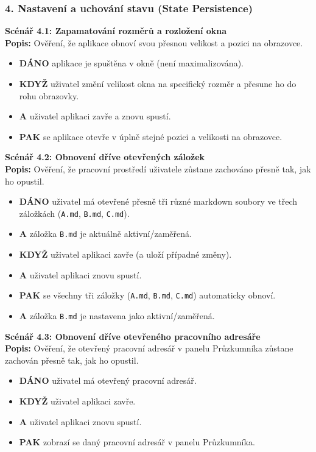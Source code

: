 \documentclass[12pt, a4paper]{article}
\begin{document}
\subsubsection*{4. Nastavení a uchování stavu (State Persistence)}

\textbf{Scénář 4.1: Zapamatování rozměrů a rozložení okna} \\
\textbf{Popis:} Ověření, že aplikace obnoví svou přesnou velikost a pozici na obrazovce.
\begin{itemize}
    \item \textbf{DÁNO} aplikace je spuštěna v okně (není maximalizována).
    \item \textbf{KDYŽ} uživatel změní velikost okna na specifický rozměr a přesune ho do rohu obrazovky.
    \item \textbf{A} uživatel aplikaci zavře a znovu spustí.
    \item \textbf{PAK} se aplikace otevře v úplně stejné pozici a velikosti na obrazovce.
\end{itemize}

\textbf{Scénář 4.2: Obnovení dříve otevřených záložek} \\
\textbf{Popis:} Ověření, že pracovní prostředí uživatele zůstane zachováno přesně tak, jak ho opustil.
\begin{itemize}
    \item \textbf{DÁNO} uživatel má otevřené přesně tři různé markdown soubory ve třech záložkách (\texttt{A.md}, \texttt{B.md}, \texttt{C.md}).
    \item \textbf{A} záložka \texttt{B.md} je aktuálně aktivní/zaměřená.
    \item \textbf{KDYŽ} uživatel aplikaci zavře (a uloží případné změny).
    \item \textbf{A} uživatel aplikaci znovu spustí.
    \item \textbf{PAK} se všechny tři záložky (\texttt{A.md}, \texttt{B.md}, \texttt{C.md}) automaticky obnoví.
    \item \textbf{A} záložka \texttt{B.md} je nastavena jako aktivní/zaměřená.
\end{itemize}

\textbf{Scénář 4.3: Obnovení dříve otevřeného pracovního adresáře} \\
\textbf{Popis:} Ověření, že otevřený pracovní adresář v panelu Průzkumníka zůstane zachován přesně tak, jak ho opustil.
\begin{itemize}
    \item \textbf{DÁNO} uživatel má otevřený pracovní adresář.
    \item \textbf{KDYŽ} uživatel aplikaci zavře.
    \item \textbf{A} uživatel aplikaci znovu spustí.
    \item \textbf{PAK} zobrazí se daný pracovní adresář v panelu Průzkumníka.
\end{itemize}
\end{document}
